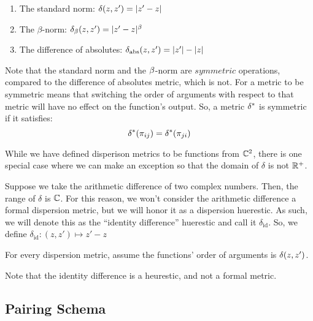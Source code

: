 \begin{enumerate}
\item The standard norm: $\delta(z,z') = |z' - z|$
\item The $\beta$-norm: $\delta_\beta(z,z') = |z' - z|^\beta$
\item The difference of absolutes: $\delta_{\text{abs}}(z,z') = |z'| - |z|$
\end{enumerate}

\begin{remark}
Note that the standard norm and the $\beta$-norm are $\textit{symmetric}$ operations, compared to the difference of absolutes metric, which is not.
For a metric to be symmetric means that switching the order of arguments with respect to that metric will have no effect on the function's output.
So, a metric $\delta^*$ is symmetric if it satisfies:
$$\delta^*({\pi_{ij}}) = \delta^*(\pi_{ji})$$
\end{remark}

While we have defined disperison metrics to be functions from $\mathbb{C}^2$, there is one special case where we can make an exception so that the domain of $\delta$ is not $\mathbb{R}^+$.

\begin{remark}
Suppose we take the arithmetic difference of two complex numbers. Then, the range of $\delta$ is $\mathbb{C}$.
For this reason, we won't consider the arithmetic difference a formal dispersion metric, but we will honor it as a dispersion huerestic.
As such, we will denote this as the ``identity difference'' huerestic and call it $\delta_{\text{id}}$. So, we define $\delta_{\text{id}}: (z, z') \mapsto z' - z$
\end{remark}

For every dispersion metric, assume the functions' order of arguments is $\delta(z, z')$. \newline
\begin{center}
\dispersiontable %
\end{center}
\vspace{1em}

\noindent *Note that the identity difference is a heurestic, and not a formal metric.

\subsection{Pairing Schema}

